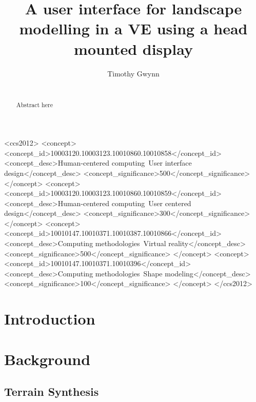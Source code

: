 \documentclass{sig-alternate-05-2015}
\begin{document}
\title{A user interface for landscape modelling in a VE using a head mounted display}

\author{
\alignauthor
Timothy Gwynn\\
       \\
}
\maketitle
\begin{CCSXML}
 	<ccs2012>
 	<concept>
 	<concept_id>10003120.10003123.10010860.10010858</concept_id>
 	<concept_desc>Human-centered computing~User interface design</concept_desc>
 	<concept_significance>500</concept_significance>
 	</concept>
 	<concept>
 	<concept_id>10003120.10003123.10010860.10010859</concept_id>
 	<concept_desc>Human-centered computing~User centered design</concept_desc>
 	<concept_significance>300</concept_significance>
 	</concept>
 	<concept>
 	<concept_id>10010147.10010371.10010387.10010866</concept_id>
 	<concept_desc>Computing methodologies~Virtual reality</concept_desc>
 	<concept_significance>500</concept_significance>
 	</concept>
 	<concept>
 	<concept_id>10010147.10010371.10010396</concept_id>
 	<concept_desc>Computing methodologies~Shape modeling</concept_desc>
 	<concept_significance>100</concept_significance>
 	</concept>
 	</ccs2012>
\end{CCSXML}
 
 

\printccsdesc
{}
\begin{abstract}
	Abstract here
\end{abstract}
\section{Introduction}
\section{Background}
\subsection{Terrain Synthesis}
\end{document}
